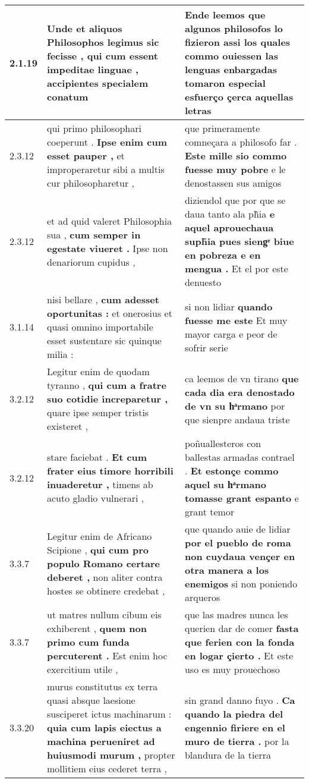 \begin{tabular}{|p{1cm}|p{6.5cm}|p{6.5cm}|}
2.1.19 & Unde et aliquos Philosophos legimus sic fecisse , \textbf{ qui cum essent impeditae linguae , } accipientes specialem conatum & Ende leemos que algunos philosofos lo fizieron \textbf{ assi los quales commo ouiessen las lenguas enbargadas } tomaron especial esfuerço çerca aquellas letras \\\hline
2.3.12 & qui primo philosophari coeperunt . \textbf{ Ipse enim cum esset pauper , } et improperaretur sibi a multis cur philosopharetur , & que primeramente comneçara a philosofo far . \textbf{ Este mille sio commo fuesse muy pobre } e le denostassen sus amigos \\\hline
2.3.12 & et ad quid valeret Philosophia sua , \textbf{ cum semper in egestate viueret . } Ipse non denariorum cupidus , & diziendol que por que se daua tanto ala ph̃ia \textbf{ e aquel aprouechaua suph̃ia pues siengͤ biue en pobreza e en mengua . } Et el por este denuesto \\\hline
3.1.14 & nisi bellare , \textbf{ cum adesset oportunitas : } et onerosius et quasi omnino importabile esset sustentare sic quinque milia : & si non lidiar \textbf{ quando fuesse me este } Et muy mayor carga e peor de sofrir serie \\\hline
3.2.12 & Legitur enim de quodam tyranno , \textbf{ qui cum a fratre suo cotidie increparetur , } quare ipse semper tristis existeret , & ca leemos de vn tirano \textbf{ que cada dia era denostado de vn su hͣrmano } por que sienpre andaua triste \\\hline
3.2.12 & stare faciebat . \textbf{ Et cum frater eius timore horribili inuaderetur , } timens ab acuto gladio vulnerari , & poñuallesteros con ballestas armadas contrael . \textbf{ Et estonçe commo aquel su hͣrmano tomasse grant espanto } e grant temor \\\hline
3.3.7 & Legitur enim de Africano Scipione , \textbf{ qui cum pro populo Romano certare deberet , } non aliter contra hostes se obtinere credebat , & que quando auie de lidiar \textbf{ por el pueblo de roma non cuydaua vençer en otra manera a los enemigos } si non poniendo arqueros \\\hline
3.3.7 & ut matres nullum cibum eis exhiberent , \textbf{ quem non primo cum funda percuterent . } Est enim hoc exercitium utile , & que las madres nunca les querien dar de comer \textbf{ fasta que ferien con la fonda en logar çierto . } Et este uso es muy prouechoso \\\hline
3.3.20 & murus constitutus ex terra quasi absque laesione susciperet ictus machinarum : \textbf{ quia cum lapis eiectus a machina perueniret ad huiusmodi murum , } propter mollitiem eius cederet terra , & sin grand danno fuyo . \textbf{ Ca quando la piedra del engennio firiere en el muro de tierra . } por la blandura de la tierra \\\hline

\end{tabular}
